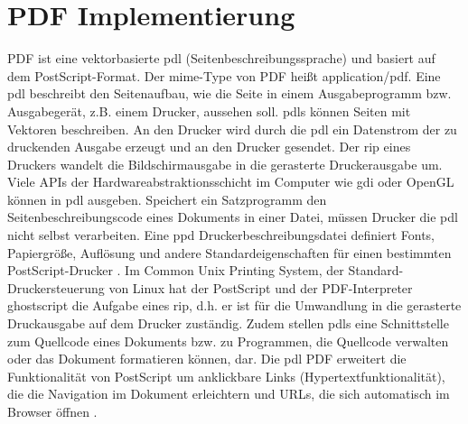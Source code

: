 \section{PDF Implementierung}
PDF ist eine vektorbasierte \gls{pdl} (Seitenbeschreibungssprache) und basiert auf dem PostScript-Format. Der \gls{mime}-Type von PDF heißt application/pdf. Eine \gls{pdl} beschreibt den Seitenaufbau, wie die Seite in einem Ausgabeprogramm bzw. Ausgabegerät, z.B. einem Drucker, aussehen soll. \gls{pdl}s können Seiten mit Vektoren beschreiben. An den Drucker wird durch die \gls{pdl} ein Datenstrom der zu druckenden Ausgabe erzeugt und an den Drucker gesendet. Der \gls{rip} eines Druckers wandelt die Bildschirmausgabe in die gerasterte Druckerausgabe um. Viele APIs der Hardwareabstraktionsschicht im Computer wie \gls{gdi} oder OpenGL können in \gls{pdl} ausgeben. Speichert ein Satzprogramm den Seitenbeschreibungscode eines Dokuments in einer Datei, müssen Drucker die \gls{pdl} nicht selbst verarbeiten. Eine \gls{ppd} Druckerbeschreibungsdatei definiert Fonts, Papiergröße, Auflösung und andere Standardeigenschaften für einen bestimmten PostScript-Drucker \cite{ppd-file}. Im Common Unix Printing System, der Standard-Druckersteuerung von Linux hat der PostScript und der PDF-Interpreter ghostscript die Aufgabe eines \gls{rip}, d.h. er ist für die Umwandlung in die gerasterte Druckausgabe auf dem Drucker zuständig. Zudem stellen \gls{pdl}s eine Schnittstelle zum Quellcode eines Dokuments bzw. zu Programmen, die Quellcode verwalten oder das Dokument formatieren können, dar. Die \gls{pdl} PDF erweitert die Funktionalität von PostScript um anklickbare Links (Hypertextfunktionalität), die die Navigation im Dokument erleichtern und URLs, die sich automatisch im Browser öffnen \cite{wiki-pdl}.

